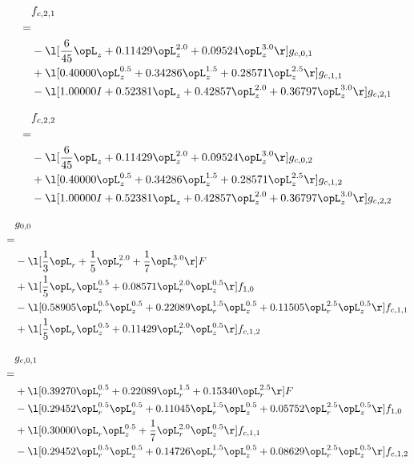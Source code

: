 \begin{alignat}{2} 
\label{eq:f_21_0} 
& f_{c,2,1} \nonumber \\ 
 = \\ 
& - \l[ \frac{6}{45} \opL_z +  0.11429 \opL_z^{2.0} +  0.09524 \opL_z^{3.0}  \r] g_{c,0,1} \nonumber \\ 
& + \l[  0.40000 \opL_z^{0.5} +  0.34286 \opL_z^{1.5} +  0.28571 \opL_z^{2.5}  \r] g_{c,1,1} \nonumber \\ 
& - \l[  1.00000 I +  0.52381 \opL_z +  0.42857 \opL_z^{2.0} +  0.36797 \opL_z^{3.0}  \r] g_{c,2,1} \nonumber \\ 
\end{alignat} 


\begin{alignat}{2} 
\label{eq:f_22_0} 
& f_{c,2,2} \nonumber \\ 
 = \\ 
& - \l[ \frac{6}{45} \opL_z +  0.11429 \opL_z^{2.0} +  0.09524 \opL_z^{3.0}  \r] g_{c,0,2} \nonumber \\ 
& + \l[  0.40000 \opL_z^{0.5} +  0.34286 \opL_z^{1.5} +  0.28571 \opL_z^{2.5}  \r] g_{c,1,2} \nonumber \\ 
& - \l[  1.00000 I +  0.52381 \opL_z +  0.42857 \opL_z^{2.0} +  0.36797 \opL_z^{3.0}  \r] g_{c,2,2} \nonumber \\ 
\end{alignat} 


\begin{alignat}{2} 
\label{eq:g_00_0} 
& g_{0,0} \nonumber \\ 
 = \\ 
& - \l[ \frac{1}{3} \opL_r + \frac{1}{5} \opL_r^{2.0} + \frac{1}{7} \opL_r^{3.0}  \r] F \nonumber \\ 
& + \l[ \frac{1}{5} \opL_r \opL_z^{0.5} +  0.08571 \opL_r^{2.0} \opL_z^{0.5}  \r] f_{1,0} \nonumber \\ 
& - \l[  0.58905 \opL_r^{0.5} \opL_z^{0.5} +  0.22089 \opL_r^{1.5} \opL_z^{0.5} +  0.11505 \opL_r^{2.5} \opL_z^{0.5}  \r] f_{c,1,1} \nonumber \\ 
& + \l[ \frac{1}{5} \opL_r \opL_z^{0.5} +  0.11429 \opL_r^{2.0} \opL_z^{0.5}  \r] f_{c,1,2} \nonumber \\ 
\end{alignat} 


\begin{alignat}{2} 
\label{eq:g_01_0} 
& g_{c,0,1} \nonumber \\ 
 = \\ 
& + \l[  0.39270 \opL_r^{0.5} +  0.22089 \opL_r^{1.5} +  0.15340 \opL_r^{2.5}  \r] F \nonumber \\ 
& - \l[  0.29452 \opL_r^{0.5} \opL_z^{0.5} +  0.11045 \opL_r^{1.5} \opL_z^{0.5} +  0.05752 \opL_r^{2.5} \opL_z^{0.5}  \r] f_{1,0} \nonumber \\ 
& + \l[  0.30000 \opL_r \opL_z^{0.5} + \frac{1}{7} \opL_r^{2.0} \opL_z^{0.5}  \r] f_{c,1,1} \nonumber \\ 
& - \l[  0.29452 \opL_r^{0.5} \opL_z^{0.5} +  0.14726 \opL_r^{1.5} \opL_z^{0.5} +  0.08629 \opL_r^{2.5} \opL_z^{0.5}  \r] f_{c,1,2} \nonumber \\ 
\end{alignat} 


